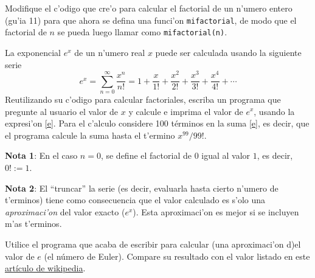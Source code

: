 \documentclass[11pt]{exam}
\begin{document}
\firstpageheadrule
\runningheadrule
{}
\cfoot{ }
\begin{flushleft}
\vspace{0.2in}

\vspace{0.25cm}
\end{flushleft}

\begin{questions}


\item Modifique el c'odigo que cre'o para calcular el factorial de un n'umero entero (gu'ia 11) para que ahora se defina una funci'on \texttt{mifactorial}, de modo que el factorial de $n$ se pueda luego llamar como \texttt{mifactorial(n)}.

\item La exponencial $e^x$ de un n'umero real $x$ puede ser calculada usando la siguiente serie
\begin{equation}\label{e}
e^x = \sum_{n=0}^\infty \frac{x^n}{n!}=1 + \frac{x}{1!} + \frac{x^2}{2!} + \frac{x^3}{3!} + \frac{x^4}{4!} + \cdots
\end{equation}
Reutilizando su c'odigo para calcular factoriales, escriba un programa que pregunte al usuario el valor de $x$ y calcule e imprima el valor de $e^x$, usando la expresi'on \eqref{e}. Para el c'alculo considere 100 términos en la suma \eqref{e}, es decir, que el programa calcule la suma hasta el t'ermino $x^{99}/{99!}$. 

\textbf{Nota 1}: En el caso $n=0$, se define el factorial de $0$ igual al valor $1$, es decir, $0! :=1$.

\textbf{Nota 2}: El ``truncar'' la serie (es decir, evaluarla hasta cierto n'umero de t'erminos) tiene como consecuencia que el valor calculado es s'olo una \textit{aproximaci'on} del valor exacto ($e^x$). Esta aproximaci'on es mejor si se incluyen m'as t'erminos.

\item Utilice el programa que acaba de escribir para calcular (una aproximaci'on d)el valor de $e$ (el n\'umero de Euler). Compare su resultado con el valor listado en este \href{https://es.wikipedia.org/wiki/N\%C3\%BAmero_e}{art\'iculo de wikipedia}.


\end{questions}
\end{document}
